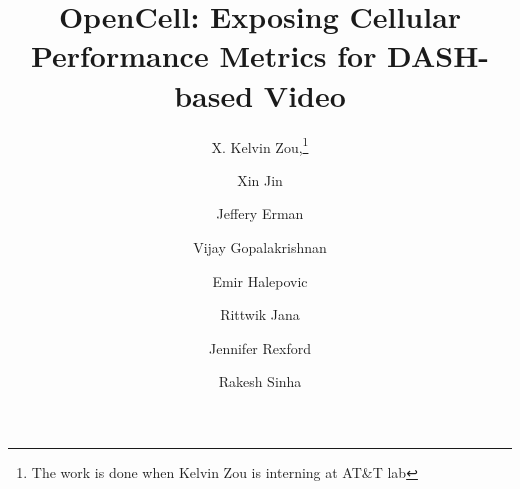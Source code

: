 \documentclass{sig-alternate-10pt}
\begin{document}
\title{OpenCell: Exposing Cellular Performance Metrics for DASH-based Video}
\author[1]{\large X. Kelvin Zou,\thanks{The work is done when Kelvin Zou is interning at AT\&T lab} }
\author[1]{\large Xin Jin}
\author[2]{\large Jeffery Erman}
\author[2]{\large Vijay Gopalakrishnan}
\author[2]{\large Emir Halepovic}
\author[2]{\large Rittwik Jana}
\author[1]{\large Jennifer Rexford}
\author[2]{\large Rakesh Sinha}
 
 


\maketitle








 
 

{\small
} 
\end{document}
